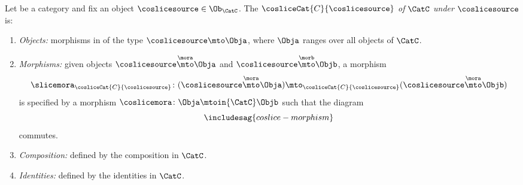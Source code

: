 \begin{ctdefinition}
\label{def:coslice-category}
   
    Let \CatC be a category and fix an object $\coslicesource \in \Ob_\CatC$. The  $\cosliceCat{C}{\coslicesource}$ \emph{of} $\CatC$ \emph{under} $\coslicesource$ is: 
    \begin{enumerate}
        \item \emph{Objects:} morphisms in \CatC of the type $\coslicesource \mto \Obja$, where $\Obja$ ranges over all objects of $\CatC$. 
        \item \emph{Morphisms:} given objects $\coslicesource \overset{\mora}{\mto} \Obja$ and $\coslicesource  \overset{\morb}{\mto} \Objb$, a morphism 
        \begin{equation}
\slicemora_{\cosliceCat{C}{\coslicesource}} \colon (\coslicesource \overset{\mora}{\mto} \Obja) \mto_{\cosliceCat{C}{\coslicesource}} (\coslicesource \overset{\mora}{\mto} \Objb)
\end{equation}
is specified by a morphism $\coslicemora \colon \Obja \mtoin{\CatC} \Objb$ such that the diagram
\begin{equation}\label{eq:coslice-morphism}
\includesag{coslice-morphism}
\end{equation}
commutes. 

\item \emph{Composition:} defined by the composition in $\CatC$.  
\item \emph{Identities:} defined by the identities in $\CatC$. 
\end{enumerate}
\end{ctdefinition}



